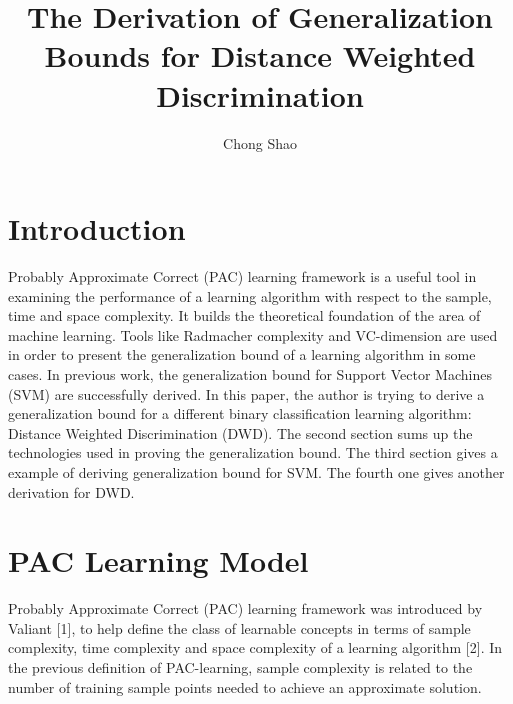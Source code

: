 \documentclass[12pt]{article}
\theoremstyle{definition}
\theoremstyle{remark}
\numberwithin{equation}{section}
\begin{document}
\title{The Derivation of Generalization Bounds for Distance Weighted Discrimination}%
\author{Chong Shao}%

\maketitle
\section{Introduction}
Probably Approximate Correct (PAC) learning framework is a useful tool in examining the performance of a learning algorithm with respect to the sample, time and space complexity. It builds the theoretical foundation of the area of machine learning. Tools like Radmacher complexity and VC-dimension are used in order to present the generalization bound of a learning algorithm in some cases. In previous work, the generalization bound for Support Vector Machines (SVM) are successfully derived. In this paper, the author is trying to derive a generalization bound for a different binary classification learning algorithm: Distance Weighted Discrimination (DWD). The second section sums up the technologies used in proving the generalization bound. The third section gives a example of deriving generalization bound for SVM. The fourth one gives another derivation for DWD.
\section{PAC Learning Model}
Probably Approximate Correct (PAC) learning framework was introduced by Valiant [1], to help define the class of learnable concepts in terms of sample complexity, time complexity and space complexity of a learning algorithm [2]. In the previous definition of PAC-learning, sample complexity is related to the number of training sample points needed to achieve an approximate solution.
\end{document}
